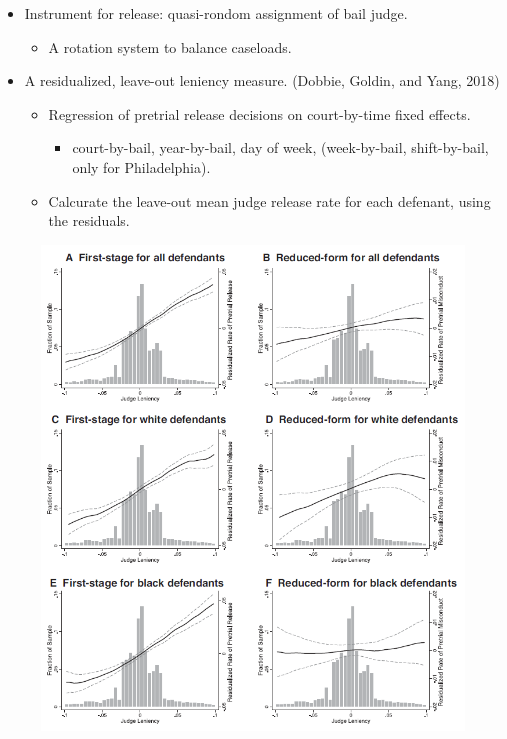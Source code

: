 \documentclass[../root]{subfiles}
\begin{document}
    \begin{itemize}
      \item Instrument for release: quasi-rondom assignment of bail judge.
      \begin{itemize}
        \item A rotation system to balance caseloads.
      \end{itemize}
      \item A residualized, leave-out leniency measure. (Dobbie, Goldin, and Yang, 2018)
      \begin{itemize}
        \item Regression of pretrial release decisions on court-by-time fixed effects.
        \begin{itemize}
          \item court-by-bail, year-by-bail, day of week, (week-by-bail, shift-by-bail, only for Philadelphia).
        \end{itemize}
        \item Calcurate the leave-out mean judge release rate for each defenant, using the residuals.
      \end{itemize}
    \end{itemize}

    \begin{figure}[h]
      \centering
      \includegraphics[scale = 1]{os0707tanji/ADY_F1}
    \end{figure}
\end{document}
